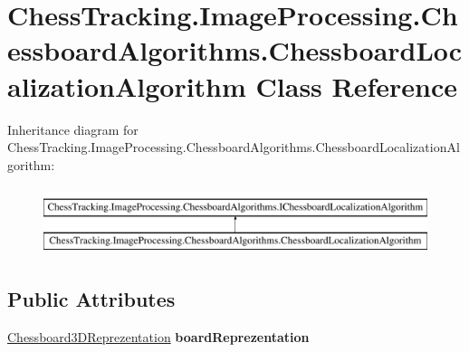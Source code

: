 \hypertarget{class_chess_tracking_1_1_image_processing_1_1_chessboard_algorithms_1_1_chessboard_localization_algorithm}{}\section{Chess\+Tracking.\+Image\+Processing.\+Chessboard\+Algorithms.\+Chessboard\+Localization\+Algorithm Class Reference}
\label{class_chess_tracking_1_1_image_processing_1_1_chessboard_algorithms_1_1_chessboard_localization_algorithm}
Inheritance diagram for Chess\+Tracking.\+Image\+Processing.\+Chessboard\+Algorithms.\+Chessboard\+Localization\+Algorithm\+:\begin{figure}[H]
\begin{center}
\leavevmode
\includegraphics[height=2.000000cm]{class_chess_tracking_1_1_image_processing_1_1_chessboard_algorithms_1_1_chessboard_localization_algorithm}
\end{center}
\end{figure}
\subsection*{Public Attributes}
\begin{DoxyCompactItemize}
\item 
\mbox{\label{class_chess_tracking_1_1_image_processing_1_1_chessboard_algorithms_1_1_chessboard_localization_algorithm_a5847f955cf4e6ddfeba5c5333e9b3ad9}} 
\mbox{\hyperlink{class_chess_tracking_1_1_image_processing_1_1_chessboard_algorithms_1_1_chessboard3_d_reprezentation}{Chessboard3\+D\+Reprezentation}} {\bfseries board\+Reprezentation}
\end{DoxyCompactItemize}
